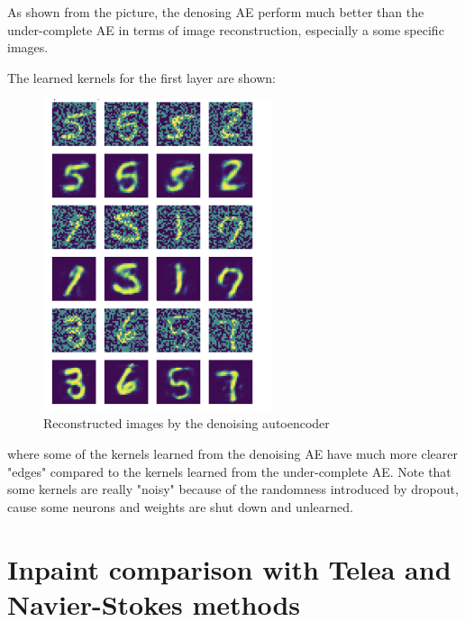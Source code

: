 As shown from the picture, the denosing AE perform much better than the under-complete AE in terms of image reconstruction, especially a some specific images.

The learned kernels for the first layer are shown: 

\begin{figure}[H]
    \centering
    \includegraphics[width=0.6\textwidth]{figs/Denoising_AE.png}
    \caption{Reconstructed images by the denoising autoencoder}
    \label{fig:Denoising AE kernels}
\end{figure}

where some of the kernels learned from the denoising AE have much more clearer "edges" compared to the kernels learned from the under-complete AE. Note that some kernels are really "noisy" because of the randomness introduced by dropout, cause some neurons and weights are shut down and unlearned.

\section{Inpaint comparison with Telea and Navier-Stokes methods}

